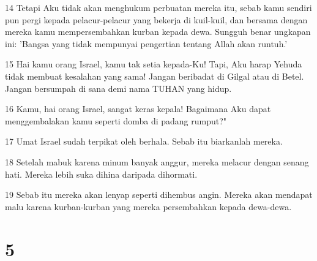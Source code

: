 \par 14 Tetapi Aku tidak akan menghukum perbuatan mereka itu, sebab kamu sendiri pun pergi kepada pelacur-pelacur yang bekerja di kuil-kuil, dan bersama dengan mereka kamu mempersembahkan kurban kepada dewa. Sungguh benar ungkapan ini: 'Bangsa yang tidak mempunyai pengertian tentang Allah akan runtuh.'
\par 15 Hai kamu orang Israel, kamu tak setia kepada-Ku! Tapi, Aku harap Yehuda tidak membuat kesalahan yang sama! Jangan beribadat di Gilgal atau di Betel. Jangan bersumpah di sana demi nama TUHAN yang hidup.
\par 16 Kamu, hai orang Israel, sangat keras kepala! Bagaimana Aku dapat menggembalakan kamu seperti domba di padang rumput?"
\par 17 Umat Israel sudah terpikat oleh berhala. Sebab itu biarkanlah mereka.
\par 18 Setelah mabuk karena minum banyak anggur, mereka melacur dengan senang hati. Mereka lebih suka dihina daripada dihormati.
\par 19 Sebab itu mereka akan lenyap seperti dihembus angin. Mereka akan mendapat malu karena kurban-kurban yang mereka persembahkan kepada dewa-dewa.

\chapter{5}

